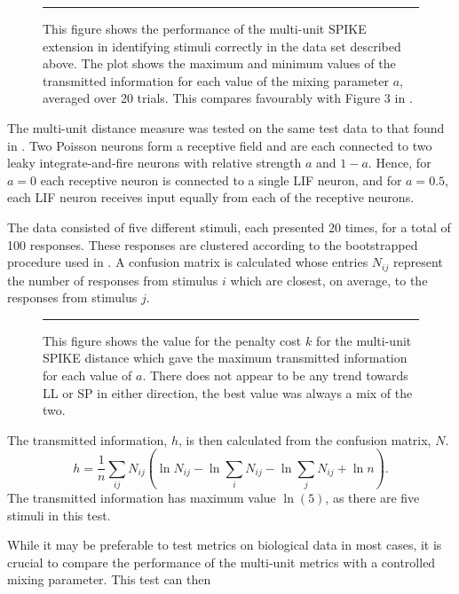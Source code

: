 \begin{figure}[htb]

\bigskip
\rule{35em}{0.5pt}
\caption{This figure shows the performance of the multi-unit SPIKE extension in identifying stimuli correctly in the data set described above.  The plot shows the maximum and minimum values of the transmitted information for each value of the mixing parameter $a$, averaged over 20 trials. This compares favourably with Figure 3 in \citep{HoughtonSen2008a}.}
\end{figure}


 The multi-unit distance measure was tested on the same test data to that found in \citep{HoughtonSen2008a}. Two Poisson neurons form a receptive field and are each connected to two leaky integrate-and-fire neurons with relative strength $a$ and $1-a$.  Hence, for $a=0$ each receptive neuron is connected to a single LIF neuron, and for $a=0.5$, each LIF neuron receives input equally from each of the receptive neurons.
 
The data consisted of five different stimuli, each presented 20 times, for a total of 100 responses.  These responses are clustered according to the bootstrapped procedure used in \citep{VictorPurpura1996a}. A confusion matrix is calculated whose entries $N_{ij}$ represent the number of responses from stimulus $i$ which are closest, on average, to the responses from stimulus $j$.

 \begin{figure}[htb]

\bigskip
\rule{35em}{0.5pt}
\caption{This figure shows the value for the penalty cost $k$ for the multi-unit SPIKE distance which gave the maximum transmitted information for each value of $a$.  There does not appear to be any trend towards LL or SP in either direction, the best value was always a mix of the two.}
\end{figure}

The transmitted information, $h$, is then calculated from the confusion matrix, $N$.
\begin{equation}
h = \frac{1}{n} \sum_{ij}N_{ij} \left( \ln N_{ij} - \ln \sum_i N_{ij} - \ln \sum_j N_{ij} + \ln n\right) .
\end{equation}
The transmitted information has maximum value $\ln(5)$, as there are five stimuli in this test.
 
While it may be preferable to test metrics on biological data in most cases, it is crucial to compare the performance of the multi-unit metrics with a controlled mixing parameter.  This test can then 
 
